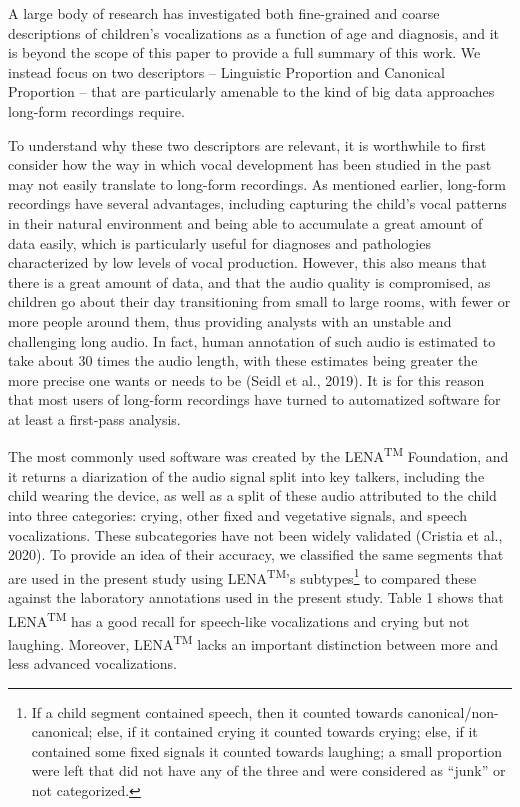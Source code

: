 \documentclass[english,,man,floatsintext]{apa6}
\begin{document}
A large body of research has investigated both fine-grained and coarse descriptions of children's vocalizations as a function of age and diagnosis, and it is beyond the scope of this paper to provide a full summary of this work. We instead focus on two descriptors -- Linguistic Proportion and Canonical Proportion -- that are particularly amenable to the kind of big data approaches long-form recordings require.

To understand why these two descriptors are relevant, it is worthwhile to first consider how the way in which vocal development has been studied in the past may not easily translate to long-form recordings. As mentioned earlier, long-form recordings have several advantages, including capturing the child's vocal patterns in their natural environment and being able to accumulate a great amount of data easily, which is particularly useful for diagnoses and pathologies characterized by low levels of vocal production. However, this also means that there is a great amount of data, and that the audio quality is compromised, as children go about their day transitioning from small to large rooms, with fewer or more people around them, thus providing analysts with an unstable and challenging long audio. In fact, human annotation of such audio is estimated to take about 30 times the audio length, with these estimates being greater the more precise one wants or needs to be (Seidl et al., 2019). It is for this reason that most users of long-form recordings have turned to automatized software for at least a first-pass analysis.

The most commonly used software was created by the LENA\textsuperscript{TM} Foundation, and it returns a diarization of the audio signal split into key talkers, including the child wearing the device, as well as a split of these audio attributed to the child into three categories: crying, other fixed and vegetative signals, and speech vocalizations. These subcategories have not been widely validated (Cristia et al., 2020). To provide an idea of their accuracy, we classified the same segments that are used in the present study using LENA\textsuperscript{TM}'s subtypes\footnote{If a child segment contained speech, then it counted towards canonical/non-canonical; else, if it contained crying it counted towards crying; else, if it contained some fixed signals it counted towards laughing; a small proportion were left that did not have any of the three and were considered as \enquote{junk} or not categorized.} to compared these against the laboratory annotations used in the present study. Table 1 shows that LENA\textsuperscript{TM} has a good recall for speech-like vocalizations and crying but not laughing. Moreover, LENA\textsuperscript{TM} lacks an important distinction between more and less advanced vocalizations.
\end{document}
